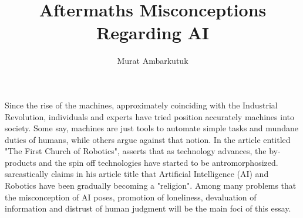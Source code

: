 \documentclass[man]{apa6}
\title{Aftermaths Misconceptions Regarding AI}
\author{Murat Ambarkutuk}
\affiliation{English Language Institute, University of Delaware \\ murata@udel.edu}
\begin{document}
\maketitle
Since the rise of the machines, approximately coinciding with the Industrial Revolution, individuals and experts have tried position accurately machines into society. Some say, machines are just tools to automate simple tasks and mundane duties of humans, while others argue against that notion. In the article entitled "The First Church of Robotics",  asserts that as technology advances, the by-products and the spin off technologies have started to be antromorphosized.  sarcastically claims in his article title that Artificial Intelligence (AI)  and Robotics have been gradually becoming a "religion". Among many problems that the misconception of AI poses, promotion of loneliness, devaluation of information and distrust of human judgment will be the main foci of this essay.\par



\end{document}
